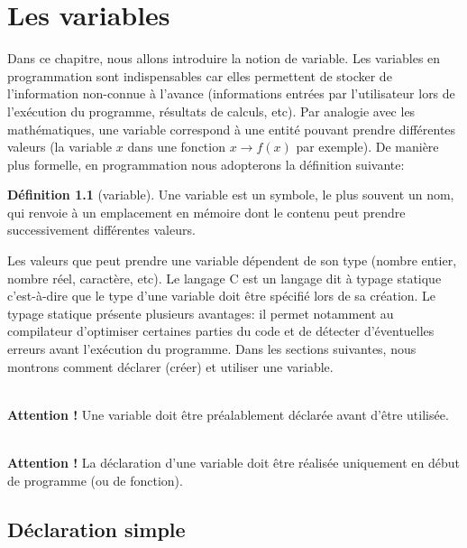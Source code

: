 \documentclass[a4paper,11pt]{book}
\newenvironment{warning} 
   {~\\ \textbf{Attention !}}{\\}
\theoremstyle{definition}
\newtheorem*{definition}{Définition}
\begin{document}
\chapter{Les variables}\label{variablec}
Dans ce chapitre, nous allons introduire la notion de variable. Les variables en programmation sont indispensables car elles permettent de stocker de l'information non-connue à l'avance (informations entrées par l'utilisateur lors de l'exécution du programme, résultats de calculs, etc). Par analogie avec les mathématiques, une variable correspond à une entité pouvant prendre différentes valeurs (la variable $x$ dans une fonction $x\to f(x)$ par exemple). De manière plus formelle, en programmation nous adopterons la définition suivante:
\begin{definition}[variable]
Une variable est un symbole, le plus souvent un nom, qui renvoie à un emplacement en mémoire dont le contenu peut prendre successivement différentes valeurs.
\end{definition}
Les valeurs que peut prendre une variable dépendent de son type (nombre entier, nombre réel, caractère, etc).  Le langage C est un langage dit à typage statique c'est-à-dire que le type d'une variable doit être spécifié lors de sa création. Le typage statique présente plusieurs avantages: il permet notamment au compilateur d'optimiser certaines parties du code et de détecter d'éventuelles erreurs avant l'exécution du programme. Dans les sections suivantes, nous montrons comment déclarer (créer) et utiliser une variable.

\begin{warning}
Une variable doit être préalablement déclarée avant d'être utilisée. 
\end{warning}

\begin{warning}
La déclaration d'une variable doit être réalisée uniquement en début de programme (ou de fonction).
\end{warning}

\section{Déclaration simple}
\end{document}
